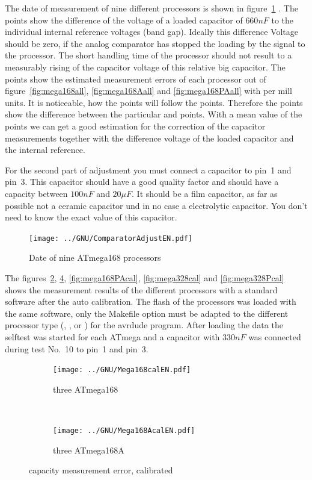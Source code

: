The date of measurement of nine different processors is shown in figure~\ref{fig:CompAdjust} .
The  points show the difference of the voltage of a loaded capacitor of \(660nF\) to the
individual internal reference voltages (band gap).
Ideally this difference Voltage should be zero, if the analog comparator has stopped the loading by the signal to
the processor. The short handling time of the processor should not result to a measurably rising of the 
capacitor voltage of this relative big capacitor.
The  points show the estimated measurement errors of each processor out of figure~\ref{fig:mega168all}, \ref{fig:mega168Aall} 
and \ref{fig:mega168PAall} with per mill units.
It is noticeable, how the  points will follow the  points.
Therefore the  points show the difference between the particular  and  points.
With a mean value of the  points we can get a good estimation for the correction of the capacitor
measurements together with the difference voltage of the loaded capacitor and the internal reference.

For the second part of adjustment you must connect a capacitor to pin~1 and pin~3. This capacitor should have
a good quality factor and should have a capacity between \(100nF\) and \(20\mu F\).
It should be a film capacitor, as far as possible not a ceramic capacitor und in no case a electrolytic capacitor.
You don't need to know the exact value of this capacitor.

\begin{figure}[H]
\centering
\texttt{[image: ../GNU/ComparatorAdjustEN.pdf]}
\caption{Date of nine ATmega168 processors}
\label{fig:CompAdjust}
\end{figure}

The figures~\ref{fig:mega168cal}, \ref{fig:mega168Acal}, \ref{fig:mega168PAcal}, \ref{fig:mega328cal} and \ref{fig:mega328Pcal}
 shows the measurement results
of the different processors with a standard software after the auto calibration.
The flash of the processors was loaded with the same software, only the Makefile  option  must be
adapted to the different processor type (, ,  or ) for the avrdude program.
After loading the data the selftest was started for each ATmega and a capacitor with \(330nF\) was connected
during test No.~10 to pin~1 and pin~3.

\begin{figure}[H]
  \begin{subfigure}[b]{.5\textwidth}
    \centering
    \texttt{[image: ../GNU/Mega168calEN.pdf]}
    \caption{three ATmega168}
    \label{fig:mega168cal}
  \end{subfigure}
  ~
  \begin{subfigure}[b]{.5\textwidth}
    \centering
    \texttt{[image: ../GNU/Mega168AcalEN.pdf]}
    \caption{three ATmega168A}
    \label{fig:mega168Acal}
  \end{subfigure}
  \caption{capacity measurement error, calibrated}
\end{figure}


